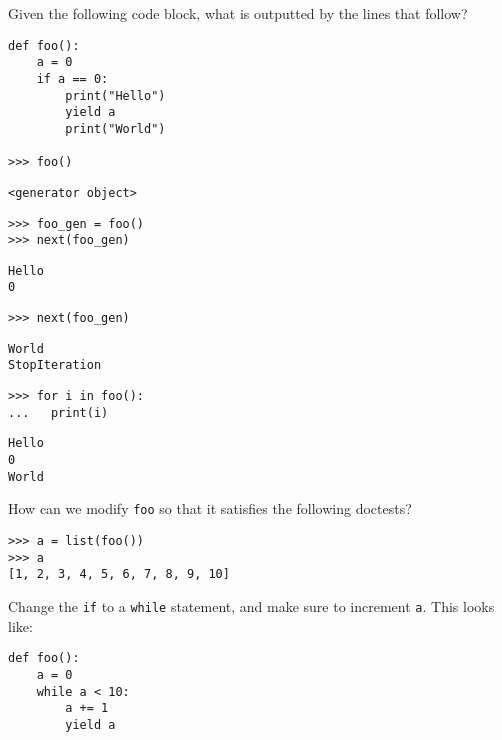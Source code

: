 \begin{blocksection}
\question Given the following code block, what is outputted by the lines that follow?

\begin{lstlisting}
def foo():
    a = 0
    if a == 0:
        print("Hello")
        yield a
        print("World")

>>> foo()
\end{lstlisting}
\begin{solution}[0.25in]
\begin{lstlisting}
<generator object>
\end{lstlisting}
\end{solution}

\begin{lstlisting}
>>> foo_gen = foo()
>>> next(foo_gen)
\end{lstlisting}

\begin{solution}[0.5in]
\begin{lstlisting}
Hello
0
\end{lstlisting}
\end{solution}

\begin{lstlisting}
>>> next(foo_gen)
\end{lstlisting}

\begin{solution}[0.5in]
\begin{lstlisting}
World
StopIteration
\end{lstlisting}
\end{solution}
\end{blocksection}

\begin{lstlisting}
>>> for i in foo():
...   print(i)
\end{lstlisting}

\begin{solution}[0.5in]
\begin{lstlisting}
Hello
0
World
\end{lstlisting}
\end{solution}
\begin{blocksection}
\question How can we modify \lstinline$foo$ so that it satisfies the following doctests?
\begin{lstlisting}
>>> a = list(foo())
>>> a
[1, 2, 3, 4, 5, 6, 7, 8, 9, 10]
\end{lstlisting}

\begin{solution}[0.50in]
Change the \lstinline$if$ to a \lstinline$while$ statement, and make sure to increment
\lstinline$a$. This looks like:

\begin{lstlisting}
def foo():
    a = 0
    while a < 10:
        a += 1
        yield a
\end{lstlisting}
\end{solution}
\end{blocksection}

